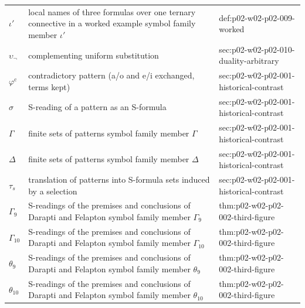 \begin{longtable}{@{}p{}p{}p{}@{}}
\(\iota'\) & local names of three formulas over one ternary connective in a worked example symbol family member \(\iota'\) & def:\allowbreak{}p02-\allowbreak{}w02-\allowbreak{}p02-\allowbreak{}009-\allowbreak{}worked \\
\(\upsilon_{\neg}\) & complementing uniform substitution & sec:\allowbreak{}p02-\allowbreak{}w02-\allowbreak{}p02-\allowbreak{}010-\allowbreak{}duality-\allowbreak{}arbitrary \\
\(\varphi^{\mathrm c}\) & contradictory pattern (a/o and e/i exchanged, terms kept) & sec:\allowbreak{}p02-\allowbreak{}w02-\allowbreak{}p02-\allowbreak{}001-\allowbreak{}historical-\allowbreak{}contrast \\
\(\sigma\) & S-reading of a pattern as an S-formula & sec:\allowbreak{}p02-\allowbreak{}w02-\allowbreak{}p02-\allowbreak{}001-\allowbreak{}historical-\allowbreak{}contrast \\
\(\Gamma\) & finite sets of patterns symbol family member \(\Gamma\) & sec:\allowbreak{}p02-\allowbreak{}w02-\allowbreak{}p02-\allowbreak{}001-\allowbreak{}historical-\allowbreak{}contrast \\
\(\Delta\) & finite sets of patterns symbol family member \(\Delta\) & sec:\allowbreak{}p02-\allowbreak{}w02-\allowbreak{}p02-\allowbreak{}001-\allowbreak{}historical-\allowbreak{}contrast \\
\(\tau_s\) & translation of patterns into S-formula sets induced by a selection & sec:\allowbreak{}p02-\allowbreak{}w02-\allowbreak{}p02-\allowbreak{}001-\allowbreak{}historical-\allowbreak{}contrast \\
\(\Gamma_9\) & S-readings of the premises and conclusions of Darapti and Felapton symbol family member \(\Gamma_9\) & thm:\allowbreak{}p02-\allowbreak{}w02-\allowbreak{}p02-\allowbreak{}002-\allowbreak{}third-\allowbreak{}figure \\
\(\Gamma_{10}\) & S-readings of the premises and conclusions of Darapti and Felapton symbol family member \(\Gamma_{10}\) & thm:\allowbreak{}p02-\allowbreak{}w02-\allowbreak{}p02-\allowbreak{}002-\allowbreak{}third-\allowbreak{}figure \\
\(\theta_9\) & S-readings of the premises and conclusions of Darapti and Felapton symbol family member \(\theta_9\) & thm:\allowbreak{}p02-\allowbreak{}w02-\allowbreak{}p02-\allowbreak{}002-\allowbreak{}third-\allowbreak{}figure \\
\(\theta_{10}\) & S-readings of the premises and conclusions of Darapti and Felapton symbol family member \(\theta_{10}\) & thm:\allowbreak{}p02-\allowbreak{}w02-\allowbreak{}p02-\allowbreak{}002-\allowbreak{}third-\allowbreak{}figure \\

\end{longtable}

